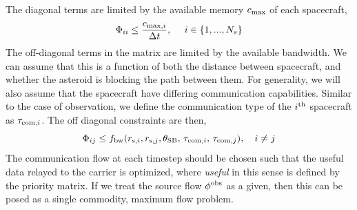 \documentclass[12pt]{article}
\begin{document}
The diagonal terms are limited by the available memory $c_{\rm max}$ of each spacecraft, 
\begin{equation}
    \Phi_{ii} \leq \frac{c_{{\rm max},i}}{\Delta t}, \quad  \,\, i\in \{1,...,N_s\}
\end{equation}
The off-diagonal terms in the matrix are limited by the available bandwidth. We can assume that this is a function of both the distance between spacecraft, and whether the asteroid is blocking the path between them. For generality, we will also assume that the spacecraft have differing communication capabilities. Similar to the case of observation, we define the communication type of the $i^{\rm th}$ spacecraft as $\tau_{{\rm com},i}$. The off diagonal constraints are then,  
\begin{equation}
    \Phi_{ij} \leq f_{\rm bw}(r_{{\rm s },i},r_{{\rm s },j},\theta_{\rm SB},\,\tau_{{\rm com},i},\, \tau_{{\rm com},j}),\quad i\not=j
\end{equation}
The communication flow at each timestep should be chosen such that the useful data relayed to the carrier is optimized, where \textit{useful} in this sense is defined by the priority matrix. If we treat the source flow $\phi^{\rm obs}$ as a given, then this can be posed as a single commodity, maximum flow problem. 


\end{document}
